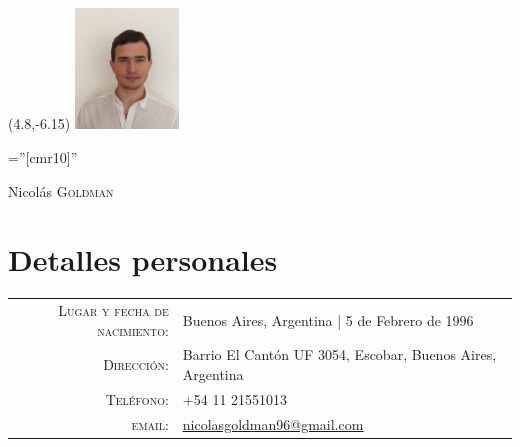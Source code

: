 \documentclass[a4paper,10pt]{article}
\begin{document}
\begin{textblock}{4}(4.8,-6.15) %
\includegraphics[width=2.75cm]{foto.jpg}
\end{textblock}

\pagestyle{empty} %

\font\fb=''[cmr10]'' %

\par{
		{\Huge Nicolás \textsc{Goldman}
	}\bigskip\par}

\bigskip
\section{Detalles personales}\smallskip

\begin{tabular}{rl}
    \textsc{Lugar y fecha de nacimiento:} & Buenos Aires, Argentina  | 5 de Febrero de 1996 \\
    \textsc{Dirección:}   & Barrio El Cantón UF 3054, Escobar, Buenos Aires, Argentina \\
    \textsc{Teléfono:}     & +54 11 21551013\\
    \textsc{email:}     & \href{mailto:nicolasgoldman96@gmail.com}{\underline{nicolasgoldman96@gmail.com}}
\smallskip\end{tabular}

\end{document}

